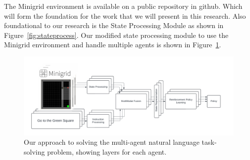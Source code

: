 \documentclass[11pt]{article}
\begin{document}
The Minigrid environment is available on a public repository in github. Which will form the foundation for the work that we will present in this research. Also foundational to our research is the State Processing Module as shown in Figure~\ref{fig:stateprocess}. Our modified state processing module to use the Minigrid environment and handle multiple agents is shown in Figure~\ref{fig:modeloverview}.





\begin{figure}[!t]
  \centering
  \includegraphics[width=\linewidth]{figs/modeloverviewactual.pdf}
  \caption{Our approach to solving the multi-agent natural language task-solving problem, showing layers for each agent.}
  \label{fig:modeloverview}
\end{figure}




% 


\end{document}
